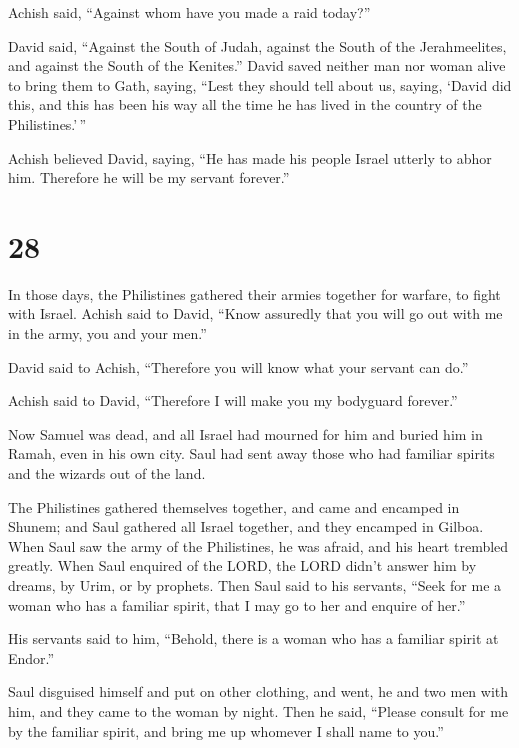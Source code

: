  Achish said, ``Against whom have you made a raid
today?''

David said, ``Against the South of Judah, against the South of the
Jerahmeelites, and against the South of the Kenites.'' 
David saved neither man nor woman alive to bring them to Gath, saying,
``Lest they should tell about us, saying, `David did this, and this has
been his way all the time he has lived in the country of the
Philistines.'\,''

 Achish believed David, saying, ``He has made his people
Israel utterly to abhor him. Therefore he will be my servant forever.''

\hypertarget{section-27}{%
\section{28}\label{section-27}}

 In those days, the Philistines gathered their armies
together for warfare, to fight with Israel. Achish said to David, ``Know
assuredly that you will go out with me in the army, you and your men.''

 David said to Achish, ``Therefore you will know what your
servant can do.''

Achish said to David, ``Therefore I will make you my bodyguard
forever.''

 Now Samuel was dead, and all Israel had mourned for him
and buried him in Ramah, even in his own city. Saul had sent away those
who had familiar spirits and the wizards out of the land.

 The Philistines gathered themselves together, and came
and encamped in Shunem; and Saul gathered all Israel together, and they
encamped in Gilboa.  When Saul saw the army of the
Philistines, he was afraid, and his heart trembled greatly.
 When Saul enquired of the LORD, the LORD didn't answer
him by dreams, by Urim, or by prophets.  Then Saul said to
his servants, ``Seek for me a woman who has a familiar spirit, that I
may go to her and enquire of her.''

His servants said to him, ``Behold, there is a woman who has a familiar
spirit at Endor.''

 Saul disguised himself and put on other clothing, and
went, he and two men with him, and they came to the woman by night. Then
he said, ``Please consult for me by the familiar spirit, and bring me up
whomever I shall name to you.''

